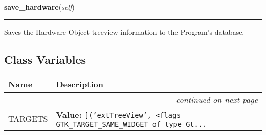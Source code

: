 \hspace{.8\funcindent}\begin{boxedminipage}{\funcwidth}

    \raggedright \textbf{save\_hardware}(\textit{self})

    \vspace{-1.5ex}

    \rule{\textwidth}{0.5\fboxrule}
\setlength{\parskip}{2ex}
    Saves the Hardware Object treeview information to the Program's 
    database.

\setlength{\parskip}{1ex}
    \end{boxedminipage}



  \subsection{Class Variables}

    \vspace{-1cm}
\hspace{\varindent}\begin{longtable}{|p{\varnamewidth}|p{\vardescrwidth}|l}
\cline{1-2}
\cline{1-2} \centering \textbf{Name} & \centering \textbf{Description}& \\
\cline{1-2}
\endhead\cline{1-2}\multicolumn{3}{r}{\small\textit{continued on next page}}\\\endfoot\cline{1-2}
\endlastfoot\raggedright T\-A\-R\-G\-E\-T\-S\- & \raggedright \textbf{Value:} 
{\tt \texttt{[}\texttt{(}\texttt{'}\texttt{extTreeView}\texttt{'}\texttt{, }{\textless}flags GTK\_TARGET\_SAME\_WIDGET of type Gt\texttt{...}}&\\
\cline{1-2}
\end{longtable}

